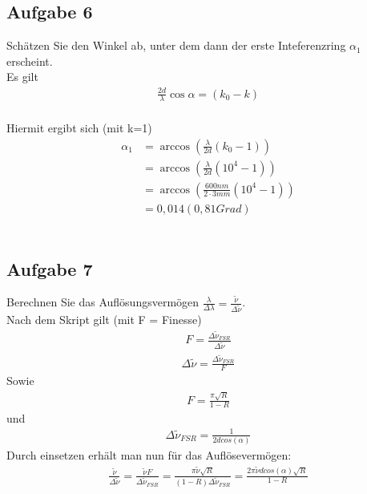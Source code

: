 \documentclass[a4paper,10pt]{scrartcl}
\begin{document}
	\subsection{Aufgabe 6}
	Schätzen Sie den Winkel ab, unter dem dann der erste Inteferenzring ${\alpha}_1$ erscheint.
	\\Es gilt
	\begin{align*}
	\frac{2d}{\lambda}\cos\alpha=(k_{0}-k)
	\end{align*}
	\\Hiermit ergibt sich (mit k=1)
	\begin{align*}
	{\alpha}_1 &=\arccos (\frac{\lambda}{2d}(k_{0}-1))
	\\ &=\arccos(\frac{\lambda}{2d}(10^4-1))
	\\ &=\arccos (\frac{600nm}{2\cdot 3mm}(10^4-1))
	\\ &=0,014 (0,81 Grad)
	\end{align*}\\
	\subsection{Aufgabe 7}
	Berechnen Sie das Auflösungsvermögen $\frac{\lambda}{\Delta\lambda}=\frac{\tilde{\nu}}{\Delta\tilde{\nu}}$.\\
	Nach dem Skript gilt (mit F = Finesse)
	\begin{align*}
	F=\frac{\Delta \tilde{\nu}_{FSR}}{\Delta \tilde{\nu}}
	\end{align*}
	\begin{align*}
	\Delta\tilde{\nu}=\frac{\Delta\tilde{\nu}_{FSR}}{F}
	\end{align*}
	Sowie
	\begin{align*}
	F=\frac{\pi\sqrt{R}}{1-R}
	\end{align*}
	und
	\begin{align*}
	\Delta\tilde{\nu}_{FSR}=\frac{1}{2dcos(\alpha)}
	\end{align*}
	Durch einsetzen erhält man nun für das Auflösevermögen:
	\begin{align*}
	\frac{\tilde{\nu}}{\Delta\tilde{\nu}}=\frac{\tilde{\nu}F}{\Delta\tilde{\nu}_{FSR}}=\frac{\pi\tilde{\nu}\sqrt{R}}{(1-R)\Delta\tilde{\nu}_{FSR}}=\frac{2\pi\tilde{\nu}dcos(\alpha)\sqrt{R}}{1-R}
	\end{align*}
	
\end{document}

